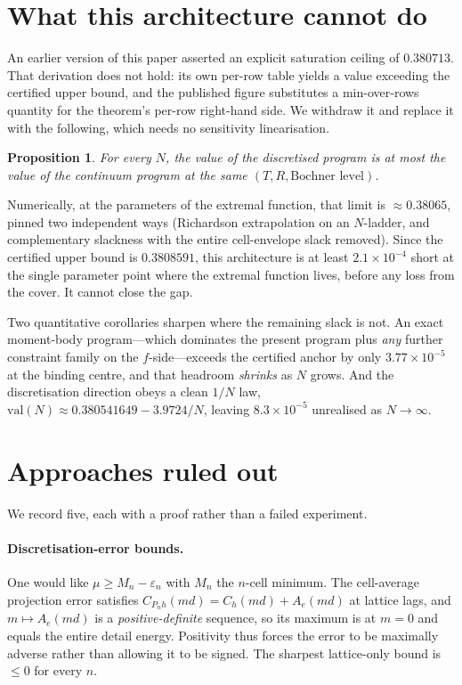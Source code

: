 \documentclass[11pt]{article}
\newtheorem{proposition}[theorem]{Proposition}
\theoremstyle{definition}
\begin{document}
\section{What this architecture cannot do}\label{sec:ceiling}

An earlier version of this paper asserted an explicit saturation ceiling
of $0.380713$. That derivation does not hold: its own per-row table
yields a value exceeding the certified upper bound, and the published
figure substitutes a min-over-rows quantity for the theorem's per-row
right-hand side. We withdraw it and replace it with the following, which
needs no sensitivity linearisation.

\begin{proposition}\label{prop:containment}
For every $N$, the value of the discretised program is at most the value
of the continuum program at the same $(T,R,\text{Bochner level})$.
\end{proposition}

Numerically, at the parameters of the extremal function, that limit is
$\approx 0.38065$, pinned two independent ways (Richardson extrapolation
on an $N$-ladder, and complementary slackness with the entire
cell-envelope slack removed). Since the certified upper bound is
$0.3808591$, this architecture is at least $2.1\times10^{-4}$ short at
the single parameter point where the extremal function lives, before any
loss from the cover. It cannot close the gap.

Two quantitative corollaries sharpen where the remaining slack is not.
An exact moment-body program---which dominates the present program plus
\emph{any} further constraint family on the $f$-side---exceeds the
certified anchor by only $3.77\times10^{-5}$ at the binding centre, and
that headroom \emph{shrinks} as $N$ grows. And the discretisation
direction obeys a clean $1/N$ law,
$\mathrm{val}(N) \approx 0.380541649 - 3.9724/N$, leaving
$8.3\times10^{-5}$ unrealised as $N \to \infty$.

\section{Approaches ruled out}\label{sec:negative}

We record five, each with a proof rather than a failed experiment.

\paragraph{Discretisation-error bounds.} One would like
$\mu \ge M_n - \varepsilon_n$ with $M_n$ the $n$-cell minimum. The
cell-average projection error satisfies
$C_{P_n h}(md) = C_h(md) + A_e(md)$ at lattice lags, and
$m \mapsto A_e(md)$ is a \emph{positive-definite} sequence, so its
maximum is at $m=0$ and equals the entire detail energy. Positivity thus
forces the error to be maximally adverse rather than allowing it to be
signed. The sharpest lattice-only bound is $\le 0$ for every $n$.
\end{document}
